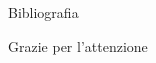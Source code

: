 \documentclass[9pt]{beamer}
\begin{document}


\begin{frame}{Bibliografia}

	
	

\end{frame}

\begin{frame}[standout]
Grazie per l'attenzione
\end{frame}
\end{document}
